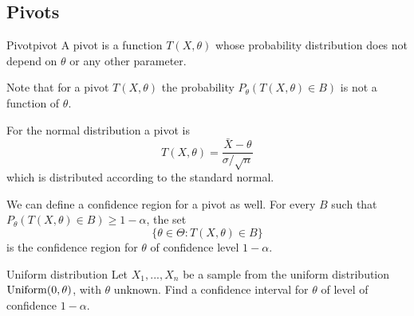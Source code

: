 \documentclass[12pt]{extarticle}
\newcommand{\Uniform}{{\operatorfont Uniform}}
\begin{document}
\subsection{Pivots}

\begin{definition}{Pivot}{pivot}
    A pivot is a function $T(X, \theta)$ whose probability distribution does not depend on $\theta$ or any other parameter.
\end{definition}

Note that for a pivot $T(X, \theta)$ the probability $P_\theta(T(X, \theta) \in B)$ is not a function of $\theta$.

For the normal distribution a pivot is
\begin{equation}
    T(X, \theta) = \frac{\bar X - \theta}{\sigma /\sqrt{n}}
\end{equation}
which is distributed according to the standard normal.

We can define a confidence region for a pivot as well.
For every $B$ such that $P_\theta(T(X, \theta) \in B) \geq 1- \alpha$, the set
\begin{equation}
    \{ \theta \in \Theta : T(X, \theta) \in B \}
\end{equation}
is the confidence region for $\theta$ of confidence level $1- \alpha$.

\begin{example}{Uniform distribution}{}
    Let $X_1,...,X_n$ be a sample from the uniform distribution $\Uniform(0,\theta)$, with $\theta$ unknown.
    Find a confidence interval for $\theta$ of level of confidence $1 - \alpha$.
\end{example}
\end{document}
